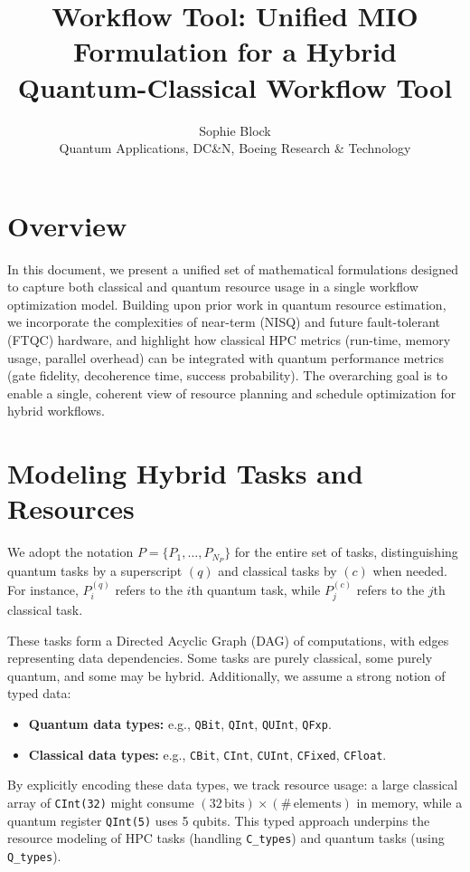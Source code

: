 \documentclass{article}
\title{\textbf{Workflow Tool: Unified MIO Formulation for a Hybrid Quantum-Classical Workflow Tool}}
\author{Sophie Block\\Quantum Applications, DC\&N, Boeing Research \& Technology}
\newcommand{\aset}[1]{{{{#1}}}}       %
\begin{document}
\maketitle
\sloppy

\section{Overview}

\noindent In this document, we present a unified set of mathematical formulations designed to capture both classical and quantum resource usage in a single workflow optimization model. Building upon prior work in quantum resource estimation, we incorporate the complexities of near-term (NISQ) and future fault-tolerant (FTQC) hardware, and highlight how classical HPC metrics (run-time, memory usage, parallel overhead) can be integrated with quantum performance metrics (gate fidelity, decoherence time, success probability). The overarching goal is to enable a single, coherent view of resource planning and schedule optimization for hybrid workflows.
\section{Modeling Hybrid Tasks and Resources}
We adopt the notation $\aset{P} = \{ P_1, \dots, P_{N_P}\}$ for the entire set of tasks, distinguishing quantum tasks by a superscript $(q)$ and classical tasks by $(c)$ when needed. For instance, $P_i^{(q)}$ refers to the $i$th quantum task, while $P_j^{(c)}$ refers to the $j$th classical task.


These tasks form a Directed Acyclic Graph (DAG) of computations, with edges representing data dependencies. Some tasks are purely classical, some purely quantum, and some may be hybrid. Additionally, we assume a strong notion of typed data:
\begin{itemize}
  \item \textbf{Quantum data types:} e.g., \texttt{QBit}, \texttt{QInt}, \texttt{QUInt}, \texttt{QFxp}.
  \item \textbf{Classical data types:} e.g., \texttt{CBit}, \texttt{CInt}, \texttt{CUInt}, \texttt{CFixed}, \texttt{CFloat}.
\end{itemize}
By explicitly encoding these data types, we track resource usage: a large classical array of \texttt{CInt(32)} might consume $(32\,\text{bits}) \times (\#\,\text{elements})$ in memory, while a quantum register \texttt{QInt(5)} uses 5 qubits. This typed approach underpins the resource modeling of HPC tasks (handling \texttt{C\_types}) and quantum tasks (using \texttt{Q\_types}).
\end{document}
